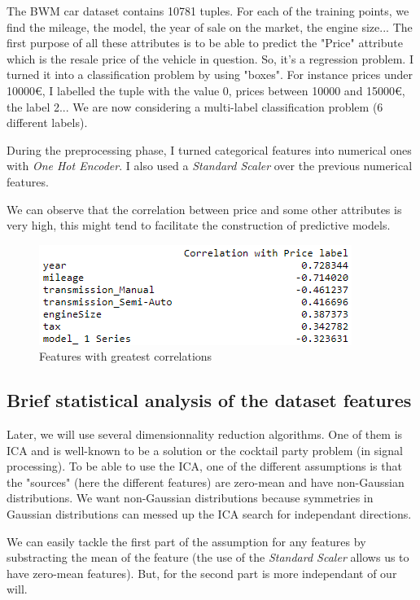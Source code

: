 \documentclass[15pt]{article}
\begin{document}
\begin{multicols}{2}
The BWM car dataset contains 10781 tuples. For each of the training points, we find the mileage, the model, the year of sale on the market, the engine size... The first purpose of all these attributes is to be able to predict the "Price" attribute which is the resale price of the vehicle in question. So, it's a regression problem. I turned it into a classification problem by using "boxes". For instance prices under 10000€, I labelled the tuple with the value 0, prices between 10000 and 15000€, the label 2...  We are now considering a multi-label classification problem (6 different labels).

During the preprocessing phase, I turned categorical features into numerical ones with \textit{One Hot Encoder}. I also used a \textit{Standard Scaler} over the previous numerical features.

We can observe that the correlation between price and some other attributes is very high, this might tend to facilitate the construction of predictive models. 

\begin{figure}[H]
\centering
\includegraphics[width = \columnwidth]{Capture1.png}
\caption{Features with greatest correlations}
\end{figure}

\subsection{Brief statistical analysis of the dataset features}

Later, we will use several dimensionnality reduction algorithms. One of them is ICA and is well-known to be a solution or the cocktail party problem (in signal processing). To be able to use the ICA, one of the different assumptions is that the "sources" (here the different features) are zero-mean and have non-Gaussian distributions. We want non-Gaussian distributions because symmetries in Gaussian distributions can messed up the ICA search for independant directions.

We can easily tackle the first part of the assumption for any features by substracting the mean of the feature (the use of the \textit{Standard Scaler} allows us to have zero-mean features). But, for the second part is more independant of our will.


\end{multicols}
\end{document}
